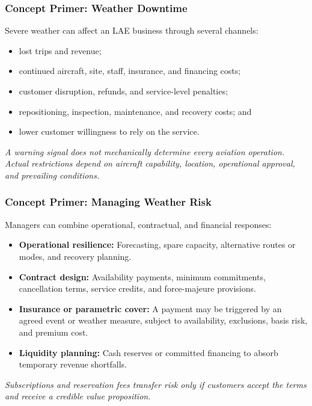 \documentclass{beamer}
\begin{document}
\begin{frame}[t]
  \frametitle{Concept Primer: Weather Downtime}
  Severe weather can affect an LAE business through several channels:
  \begin{itemize}
    \item lost trips and revenue;
    \item continued aircraft, site, staff, insurance, and financing costs;
    \item customer disruption, refunds, and service-level penalties;
    \item repositioning, inspection, maintenance, and recovery costs; and
    \item lower customer willingness to rely on the service.
  \end{itemize}
  \textit{A warning signal does not mechanically determine every aviation operation. Actual restrictions depend on aircraft capability, location, operational approval, and prevailing conditions.}
\end{frame}

\begin{frame}[t]
  \frametitle{Concept Primer: Managing Weather Risk}
  Managers can combine operational, contractual, and financial responses:
  \begin{itemize}
    \item \textbf{Operational resilience:} Forecasting, spare capacity, alternative routes or modes, and recovery planning.
    \item \textbf{Contract design:} Availability payments, minimum commitments, cancellation terms, service credits, and force-majeure provisions.
    \item \textbf{Insurance or parametric cover:} A payment may be triggered by an agreed event or weather measure, subject to availability, exclusions, basis risk, and premium cost.
    \item \textbf{Liquidity planning:} Cash reserves or committed financing to absorb temporary revenue shortfalls.
  \end{itemize}
  \textit{Subscriptions and reservation fees transfer risk only if customers accept the terms and receive a credible value proposition.}
\end{frame}
\end{document}
